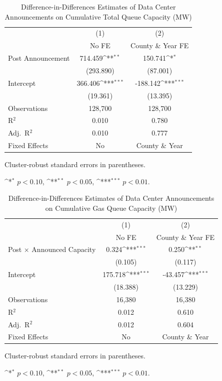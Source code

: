 \documentclass[a4paper,fleqn,longmktitle]{cas-sc}
\newcommand{\sym}[1]{\ifmmode^{#1}\else\(^{#1}\)\fi}
\begin{document}
\begin{table}[htbp]\centering
\caption{Difference-in-Differences Estimates of Data Center Announcements on Cumulative Total Queue Capacity (MW)}
\begin{threeparttable}
\begin{tabular}{lcc}
\toprule
& (1) & (2) \\
& No FE & County \& Year FE \\
\midrule
Post Announcement & 714.459\sym{**} & 150.741\sym{*} \\
& (293.890) & (87.001) \\
Intercept & 366.406\sym{***} & -188.142\sym{***} \\
& (19.361) & (13.395) \\
\midrule
Observations & 128,700 & 128,700 \\
R$^2$ & 0.010 & 0.780 \\
Adj.\ R$^2$ & 0.010 & 0.777 \\
Fixed Effects & No & County \& Year \\
\bottomrule
\end{tabular}
\begin{tablenotes}[flushleft]
\footnotesize
\item Cluster-robust standard errors in parentheses. 
\item \sym{*} $p<0.10$, \sym{**} $p<0.05$, \sym{***} $p<0.01$. 
\end{tablenotes}
\end{threeparttable}
\label{DIDTotal}
\end{table}

\begin{table}[htbp]\centering
\caption{Difference-in-Differences Estimates of Data Center Announcements on Cumulative Gas Queue Capacity (MW)}
\begin{threeparttable}
\begin{tabular}{lcc}
\toprule
& (1) & (2) \\
& No FE & County \& Year FE \\
\midrule
Post $\times$ Announced Capacity & 0.324\sym{***} & 0.250\sym{**} \\
& (0.105) & (0.117) \\
Intercept & 175.718\sym{***} & -43.457\sym{***} \\
& (18.388) & (13.229) \\
\midrule
Observations & 16,380 & 16,380 \\
R$^2$ & 0.012 & 0.610 \\
Adj.\ R$^2$ & 0.012 & 0.604 \\
Fixed Effects & No & County \& Year \\
\bottomrule
\end{tabular}
\begin{tablenotes}[flushleft]
\footnotesize
\item Cluster-robust standard errors in parentheses. 
\item \sym{*} $p<0.10$, \sym{**} $p<0.05$, \sym{***} $p<0.01$. 
\end{tablenotes}
\end{threeparttable}
\label{DIDGas}
\end{table}
\end{document}
